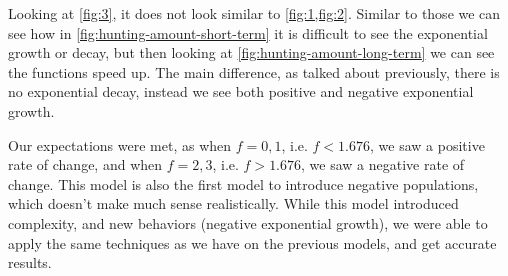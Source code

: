 \documentclass{article}
\begin{document}


Looking at \cref{fig:3}, it does not look similar to \cref{fig:1,fig:2}. Similar to those we can see how in \cref{fig:hunting-amount-short-term} it is difficult to see the exponential growth or decay, but then looking at \cref{fig:hunting-amount-long-term} we can see the functions speed up. The main difference, as talked about previously, there is no exponential decay, instead we see both positive and negative exponential growth.

Our expectations were met, as when $f=0,1$, i.e. $f < 1.676$, we saw a positive rate of change, and when $f=2,3$, i.e. $f > 1.676$, we saw a negative rate of change. This model is also the first model to introduce negative populations, which doesn't make much sense realistically. While this model introduced complexity, and new behaviors (negative exponential growth), we were able to apply the same techniques as we have on the previous models, and get accurate results.
\end{document}
